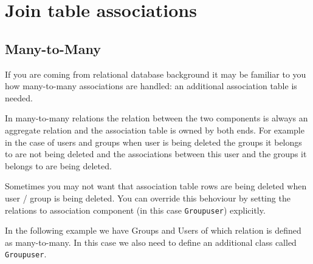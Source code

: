\documentclass[11pt,a4paper]{report}
\begin{document}
\section{Join table associations}
\subsection{Many-to-Many}
If you are coming from relational database background it may be familiar to you how many-to-many associations are handled: an additional association table is needed.

In many-to-many relations the relation between the two components is always an aggregate relation and the association table is owned by both ends. For example in the case of users and groups when user is being deleted the groups it belongs to are not being deleted and the associations between this user and the groups it belongs to are being deleted.

Sometimes you may not want that association table rows are being deleted when user / group is being deleted. You can override this behoviour by setting the relations to association component (in this case \texttt{Groupuser}) explicitly.

In the following example we have Groups and Users of which relation is defined as many-to-many. In this case we also need to define an additional class called \texttt{Groupuser}.
\end{document}
